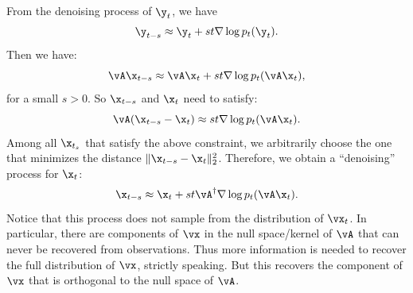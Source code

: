 \documentclass[../../book-main.tex]{subfiles}
\begin{document}
From the denoising process of $\y_t$, we have
\begin{equation}
    \y_{t-s} \approx  \y_t + st \nabla \log p_t(\y_t).
\end{equation}
Then we have:
\begin{equation}
    \vA\x_{t-s} \approx   \vA\x_t + st \nabla \log p_t(\vA \x_t),
\end{equation}
for a small $s >0$. So $\x_{t-s}$ and $\x_t$ need to satisfy:
\begin{equation}
    \vA(\x_{t-s} - \x_t) \approx st \nabla \log p_t(\vA\x_t). 
\end{equation}
Among all $\x_{t_s}$ that satisfy the above constraint, we arbitrarily choose the one that minimizes the distance $\|\x_{t-s} - \x_t\|_2^2$. Therefore, we obtain a ``denoising'' process for $\x_t$:
\begin{equation}
    \x_{t-s}  \approx \x_t + st\vA^\dagger \nabla \log p_t(\vA\x_t). 
\label{eqn:denoising-projection}
\end{equation}
Notice that this process does not sample from the distribution of $\vx_t$. In particular, there are components of $\vx$ in the null space/kernel of $\vA$ that can never be recovered from observations. Thus more information is needed to recover the full distribution of $\vx$, strictly speaking. But this recovers the component of $\vx$ that is orthogonal to the null space of $\vA$.
\end{document}
